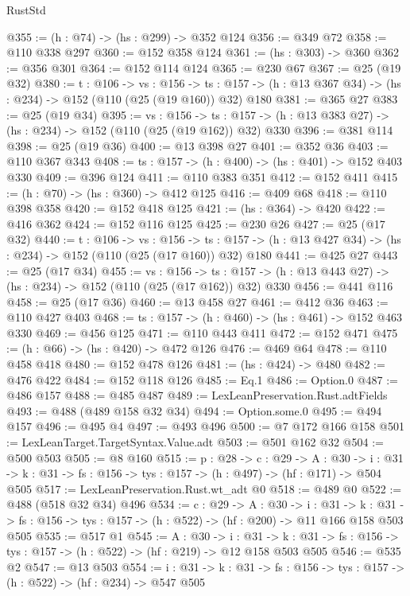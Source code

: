 \begin{lexlean}{RustStd}
\begin{coremodule}
@355 := (h : @74) -> (hs : @299) -> @352 @124
@356 := @349 @72
@358 := @110 @338 @297
@360 := @152 @358 @124
@361 := (hs : @303) -> @360
@362 := @356 @301
@364 := @152 @114 @124
@365 := @230 @67
@367 := @25 (@19 @32)
@380 := {t : @106} ->
  {vs : @156} ->
  {ts : @157} -> (h : @13 @367 @34) -> (hs : @234) -> @152 (@110 (@25 (@19 @160)) @32) @180
@381 := @365 @27
@383 := @25 (@19 @34)
@395 := {vs : @156} ->
  {ts : @157} -> (h : @13 @383 @27) -> (hs : @234) -> @152 (@110 (@25 (@19 @162)) @32) @330
@396 := @381 @114
@398 := @25 (@19 @36)
@400 := @13 @398 @27
@401 := @352 @36
@403 := @110 @367 @343
@408 := {ts : @157} -> (h : @400) -> (hs : @401) -> @152 @403 @330
@409 := @396 @124
@411 := @110 @383 @351
@412 := @152 @411
@415 := (h : @70) -> (hs : @360) -> @412 @125
@416 := @409 @68
@418 := @110 @398 @358
@420 := @152 @418 @125
@421 := (hs : @364) -> @420
@422 := @416 @362
@424 := @152 @116 @125
@425 := @230 @26
@427 := @25 (@17 @32)
@440 := {t : @106} ->
  {vs : @156} ->
  {ts : @157} -> (h : @13 @427 @34) -> (hs : @234) -> @152 (@110 (@25 (@17 @160)) @32) @180
@441 := @425 @27
@443 := @25 (@17 @34)
@455 := {vs : @156} ->
  {ts : @157} -> (h : @13 @443 @27) -> (hs : @234) -> @152 (@110 (@25 (@17 @162)) @32) @330
@456 := @441 @116
@458 := @25 (@17 @36)
@460 := @13 @458 @27
@461 := @412 @36
@463 := @110 @427 @403
@468 := {ts : @157} -> (h : @460) -> (hs : @461) -> @152 @463 @330
@469 := @456 @125
@471 := @110 @443 @411
@472 := @152 @471
@475 := (h : @66) -> (hs : @420) -> @472 @126
@476 := @469 @64
@478 := @110 @458 @418
@480 := @152 @478 @126
@481 := (hs : @424) -> @480
@482 := @476 @422
@484 := @152 @118 @126
@485 := Eq.{1}
@486 := Option.{0}
@487 := @486 @157
@488 := @485 @487
@489 := LexLeanPreservation.Rust.adtFields
@493 := @488 (@489 @158 @32 @34)
@494 := Option.some.{0}
@495 := @494 @157
@496 := @495 @4
@497 := @493 @496
@500 := @7 @172 @166 @158
@501 := LexLeanTarget.TargetSyntax.Value.adt
@503 := @501 @162 @32
@504 := @500 @503
@505 := @8 @160
@515 := {p : @28} ->
  {c : @29} ->
  {A : @30} ->
  {i : @31} -> {k : @31} -> {fs : @156} -> {tys : @157} -> (h : @497) -> (hf : @171) -> @504 @505
@517 := LexLeanPreservation.Rust.wt_adt @0
@518 := @489 @0
@522 := @488 (@518 @32 @34) @496
@534 := {c : @29} ->
  {A : @30} ->
  {i : @31} ->
  {k : @31} -> {fs : @156} -> {tys : @157} -> (h : @522) -> (hf : @200) -> @11 @166 @158 @503 @505
@535 := @517 @1
@545 := {A : @30} ->
  {i : @31} ->
  {k : @31} -> {fs : @156} -> {tys : @157} -> (h : @522) -> (hf : @219) -> @12 @158 @503 @505
@546 := @535 @2
@547 := @13 @503
@554 := {i : @31} ->
  {k : @31} -> {fs : @156} -> {tys : @157} -> (h : @522) -> (hf : @234) -> @547 @505

\end{coremodule}
\end{lexlean}
